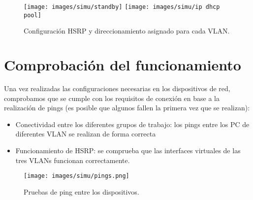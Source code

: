 \pagebreak

    \begin{figure}[h]
    	\centering
    	\texttt{[image: images/simu/standby]}
        \texttt{[image: images/simu/ip dhcp pool]}
    	\caption{Configuración HSRP y direccionamiento asignado para cada VLAN.}
    	\label{fig:standby-direccionamiento}
    \end{figure}
    
\vspace{1mm}

\section{Comprobación del funcionamiento}

Una vez realizadas las configuraciones necesarias en los dispositivos de red, comprobamos que se cumple con los requisitos de conexión en base a la realización de pings (es posible que algunos fallen la primera vez que se realizan):
\begin{itemize}
    \item Conectividad entre los diferentes grupos de trabajo: los pings entre los PC de diferentes VLAN se realizan de forma correcta \vspace{1mm}
    \item Funcionamiento de HSRP: se comprueba que las interfaces virtuales de las tres VLANs funcionan correctamente.
\end{itemize}

\vspace{2mm}

    \begin{figure}[h]
    	\centering
        \texttt{[image: images/simu/pings.png]}
    	\caption{Pruebas de ping entre los dispositivos.}
    	\label{fig:pings}
    \end{figure}
    

    
    
    



    



